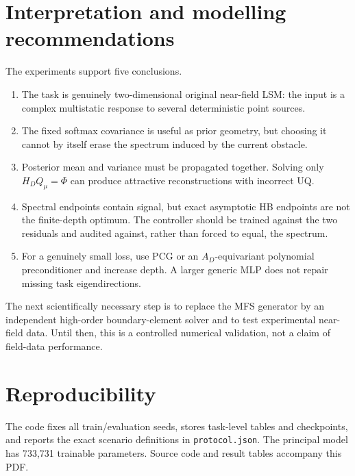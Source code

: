 \documentclass[10pt]{article}
\begin{document}
\section{Interpretation and modelling recommendations}
The experiments support five conclusions.
\begin{enumerate}
\item The task is genuinely two-dimensional original near-field LSM: the input
is a complex multistatic response to several deterministic point sources.
\item The fixed softmax covariance is useful as prior geometry, but choosing it
cannot by itself erase the spectrum induced by the current obstacle.
\item Posterior mean and variance must be propagated together.  Solving only
$H_DQ_\mu=\Phi$ can produce attractive reconstructions with incorrect UQ.
\item Spectral endpoints contain signal, but exact asymptotic HB endpoints are
not the finite-depth optimum.  The controller should be trained against the
two residuals and audited against, rather than forced to equal, the spectrum.
\item For a genuinely small loss, use PCG or an $A_D$-equivariant polynomial
preconditioner and increase depth.  A larger generic MLP does not repair missing
task eigendirections.
\end{enumerate}

The next scientifically necessary step is to replace the MFS generator by an
independent high-order boundary-element solver and to test experimental near-
field data.  Until then, this is a controlled numerical validation, not a claim
of field-data performance.

\section{Reproducibility}
The code fixes all train/evaluation seeds, stores task-level tables and
checkpoints, and reports the exact scenario definitions in
\texttt{protocol.json}.  The principal model has
733,731 trainable parameters.  Source code and result
tables accompany this PDF.
\end{document}
